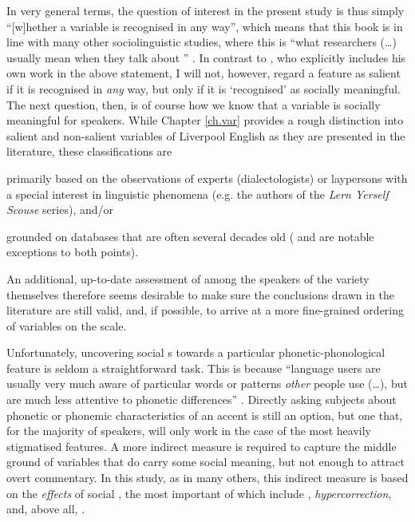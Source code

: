 In very general terms, the question of interest in the present study is thus simply ``[w]hether a variable is recognised in any way'', which means that this book is in line with many other sociolinguistic studies, where this is ``what researchers (\dots) usually mean when they talk about \emph{}'' \parencite[4, emphasis in original]{racz2013}.
In contrast to \textcite{racz2013}, who explicitly includes his own work in the above statement, I will not, however, regard a feature as salient if it is recognised in \emph{any} way, but only if it is `recognised' as socially meaningful.
The next question, then, is of course how we know that a variable is socially meaningful for speakers.
While Chapter \ref{ch.var} provides a rough distinction into salient and non-salient variables of Liverpool English as they are presented in the literature, these classifications are
\begin{inparaenum}[(1)]
	\item primarily based on the observations of experts (dialectologists) or laypersons with a special interest in linguistic phenomena (e.g. the authors of the \emph{Lern Yerself Scouse} series), and/or
	\item grounded on databases that are often several decades old (\citealt{watsonclark2013} and \citealt{watsonclark2015} are notable exceptions to both points).
\end{inparaenum}
An additional, up-to-date assessment of  among the speakers of the variety themselves therefore seems desirable to make sure the conclusions drawn in the literature are still valid, and, if possible, to arrive at a more fine-grained ordering of variables on the  scale.

Unfortunately, uncovering social s towards a particular phonetic-phonological feature is seldom a straightforward task.
This is because ``language users are usually very much aware of particular words or  patterns \emph{other} people use (\ldots), but are much less attentive to phonetic differences'' \parencite[3, emphasis in the original]{racz2013}.
Directly asking subjects about phonetic or phonemic characteristics of an accent is still an option, but one that, for the majority of speakers, will only work in the case of the most heavily stigmatised features.
A more indirect measure is required to capture the middle ground of variables that do carry some social meaning, but not enough to attract overt commentary.
In this study, as in many others, this indirect measure is based on the \emph{effects} of social , the most important of which include \emph{}, \emph{hypercorrection}, and, above all, \emph{}.

